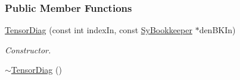 \subsubsection*{Public Member Functions}
\begin{DoxyCompactItemize}
\item 
\hyperlink{classCheMPS2_1_1TensorDiag_ab9473592e2028e2bd126e4c957f78de0}{Tensor\-Diag} (const int index\-In, const \hyperlink{classCheMPS2_1_1SyBookkeeper}{Sy\-Bookkeeper} $\ast$den\-B\-K\-In)
\begin{DoxyCompactList}\small\item\em Constructor. \end{DoxyCompactList}\item 
\hypertarget{classCheMPS2_1_1TensorDiag_a1f5af4c0e7231a3b902d21f398f9d063}{\hyperlink{classCheMPS2_1_1TensorDiag_a1f5af4c0e7231a3b902d21f398f9d063}{$\sim$\-Tensor\-Diag} ()}\label{classCheMPS2_1_1TensorDiag_a1f5af4c0e7231a3b902d21f398f9d063}


\end{DoxyCompactItemize}
